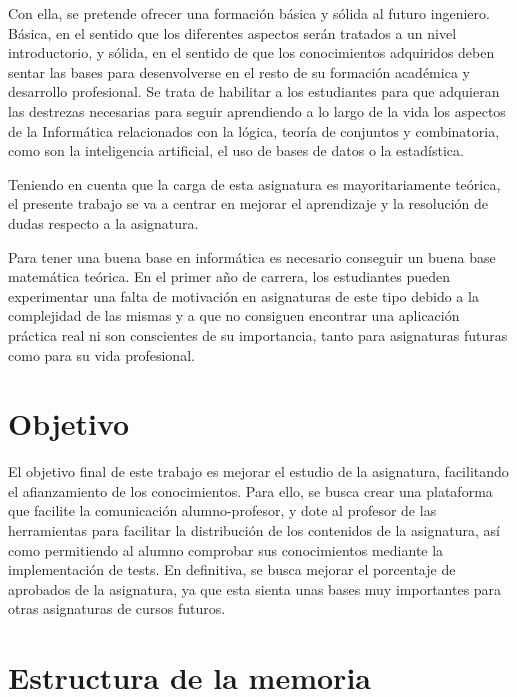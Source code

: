 \documentclass[openright,twoside,10pt]{book}
\begin{document}
    Con ella, se pretende ofrecer una formación básica y sólida al futuro
    ingeniero. Básica, en el sentido que los diferentes aspectos serán
    tratados a un nivel introductorio, y sólida, en el sentido de que los
    conocimientos adquiridos deben sentar las bases para desenvolverse en el
    resto de su formación académica y desarrollo profesional. Se trata de
    habilitar a los estudiantes para que adquieran las destrezas necesarias
    para seguir aprendiendo a lo largo de la vida los aspectos de la
    Informática relacionados con la lógica, teoría de conjuntos y
    combinatoria, como son la inteligencia artificial, el uso de bases de
    datos o la estadística.
    
    Teniendo en cuenta que la carga de esta asignatura es mayoritariamente
    teórica, el presente trabajo se va a centrar en mejorar el aprendizaje y
    la resolución de dudas respecto a la asignatura.
    
    Para tener una buena base en informática es necesario conseguir un buena
    base matemática teórica. En el primer año de carrera, los estudiantes
    pueden experimentar una falta de motivación en asignaturas de este tipo
    debido a la complejidad de las mismas y a que no consiguen encontrar una
    aplicación práctica real ni son conscientes de su importancia, tanto
    para asignaturas futuras como para su vida profesional.
    
    \section{Objetivo}\label{objetivo}
    
    El objetivo final de este trabajo es mejorar el estudio de la
    asignatura, facilitando el afianzamiento de los conocimientos. Para
    ello, se busca crear una plataforma que facilite la comunicación
    alumno-profesor, y dote al profesor de las herramientas para facilitar
    la distribución de los contenidos de la asignatura, así como permitiendo
    al alumno comprobar sus conocimientos mediante la implementación de
    tests. En definitiva, se busca mejorar el porcentaje de aprobados de la
    asignatura, ya que esta sienta unas bases muy importantes para otras
    asignaturas de cursos futuros.
    
    \section{Estructura de la memoria}\label{estructura-de-la-memoria}
    
\end{document}
